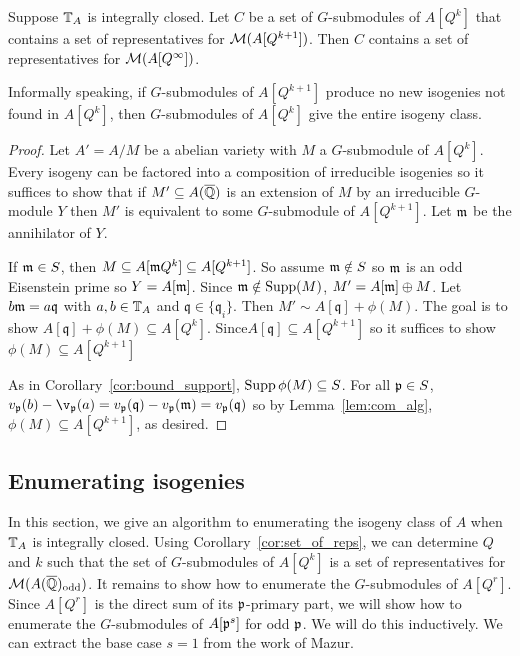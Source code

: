 \documentclass{article}
\renewcommand{\q}{\mathfrak{q}}
\newcommand{\odd}{\mathrm{odd}}
\begin{document}
\begin{corollary}%
    \label{cor:set_of_reps}
    Suppose $\mathbb{T}_A$ is integrally closed. Let $C$ be a set of $G$-submodules of
    $A[Q^k]$ that contains a set of representatives for $\mathcal{M}(A[Q^{k+1}])$. Then
    $C$ contains a set of representatives for $\mathcal{M}(A[Q^\infty])$.
    
    Informally speaking, if $G$-submodules of $A[Q^{k+1}]$ produce no new
    isogenies not found in $A[Q^k]$, then $G$-submodules of $A[Q^k]$ give the
    entire isogeny class.
\end{corollary}
\begin{proof}
    Let $A'=A/M$ be a abelian variety with $M$ a $G$-submodule of $A[Q^k]$.
    Every isogeny can be factored into a composition of irreducible isogenies
    so it suffices to show that if $M'\subseteq A(\overline{\mathbb{Q}})$ is an extension of
    $M$ by an irreducible $G$-module $Y$ then $M'$ is equivalent to some
    $G$-submodule of $A[Q^{k+1}]$. Let $\mathfrak{m}$ be the annihilator of $Y$. 
    
    If $\mathfrak{m}\in S$, then $M\subseteq A[\mathfrak{m} Q^k]\subseteq A[Q^{k+1}]$. So assume
    $\mathfrak{m}\notin S$ so $\mathfrak{m}$ is an odd Eisenstein prime so $Y=A[\mathfrak{m}]$. Since
    $\mathfrak{m}\notin \operatorname{Supp}(M)$, $M' = A[\mathfrak{m}]\oplus M$. Let $b\m=a\q$ with $a,b\in
    \mathbb{T}_A$ and $\q\in \{\q_i\}$. Then $M'\sim A[\q] + \phi(M)$. The goal is to
    show $A[\q]+\phi(M)\subseteq A[Q^k]$. Since$A[\q]\subseteq
    A[Q^{k+1}]$ so it suffices to show $\phi(M)\subseteq A[Q^{k+1}]$
    
    As in Corollary~\ref{cor:bound_support}, $\operatorname{Supp}\phi(M)\subseteq S$. For all
    $\mathfrak{p}\in S$, $v_\p(b)-\v_\p(a) = v_\p(\q)-v_\p(\m)=v_\p(\q)$ so by
    Lemma~\ref{lem:com_alg}, $\phi(M)\subseteq A[Q^{k+1}]$, as desired.
\end{proof}

\subsection{Enumerating isogenies}%
\label{sub:enumerating_isogenies}

In this section, we give an algorithm to enumerating the isogeny class of $A$
when $\mathbb{T}_A$ is integrally closed. Using Corollary~\ref{cor:set_of_reps}, we
can determine $Q$ and $k$ such that the set of $G$-submodules of $A[Q^k]$ is a
set of representatives for $\M(A(\QQbar)_\odd)$. It remains to show how to
enumerate the $G$-submodules of $A[Q^r]$. Since $A[Q^r]$ is the direct sum of
its $\mathfrak{p}$-primary part, we will show how to enumerate the $G$-submodules of
$A[\mathfrak{p}^s]$ for odd $\mathfrak{p}$. We will do this inductively. We can extract the base
case $s=1$ from the work of Mazur.
\end{document}
